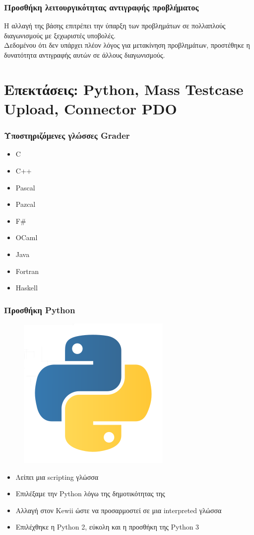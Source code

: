 \documentclass{beamer}
\begin{document}
\begin{frame}
  \frametitle{Προσθήκη λειτουργικότητας αντιγραφής προβλήματος}

  Η αλλαγή της βάσης επιτρέπει την ύπαρξη των προβλημάτων σε πολλαπλούς διαγωνισμούς
  με ξεχωριστές υποβολές. \\[0.3cm]

  Δεδομένου ότι δεν υπάρχει πλέον λόγος για μετακίνηση προβλημάτων, προστέθηκε η
  δυνατότητα αντιγραφής αυτών σε άλλους διαγωνισμούς.
\end{frame}

\section{Επεκτάσεις: Python, Mass Testcase Upload, Connector PDO}

\begin{frame}
  \frametitle{Υποστηριζόμενες γλώσσες Grader}
  \begin{itemize}
      \setlength\itemsep{0em}
      \item C
      \item C++
      \item Pascal
      \item Pazcal
      \item F\#
      \item OCaml
      \item Java
      \item Fortran
      \item Haskell
  \end{itemize}
\end{frame}

\begin{frame}
  \frametitle{Προσθήκη Python}

  \begin{figure}
    \includegraphics[scale=0.4]{../Figures/python.png}
  \end{figure}

  \begin{itemize}
      \item Λείπει μια scripting γλώσσα
      \item Επιλέξαμε την Python λόγω της δημοτικότητας της
      \item Αλλαγή στον Kewii ώστε να προσαρμοστεί σε μια interpreted γλώσσα
      \item Επιλέχθηκε η Python 2, εύκολη και η προσθήκη της Python 3
  \end{itemize}
\end{frame}
\end{document}
